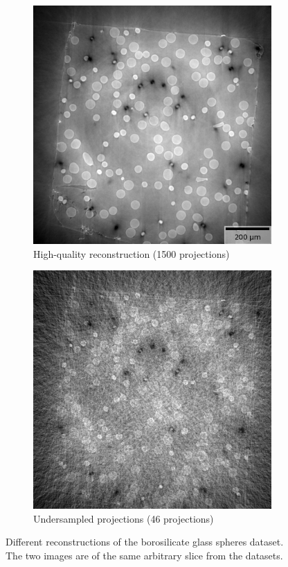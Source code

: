 \begin{figure}
    \begin{subfigure}[t]{.45\textwidth}
      \centering
      \includegraphics[width=\linewidth]{figures/gt32.png}
      \caption{High-quality reconstruction (1500 projections)}
    \end{subfigure}
    \hfill
    \begin{subfigure}[t]{.45\textwidth}
      \centering
      \includegraphics[width=\linewidth]{figures/ns32.png}
      \caption{Undersampled projections (46 projections)}
    \end{subfigure}
    \caption[Borosilicate glass spheres dataset]{Different reconstructions of the borosilicate glass spheres dataset. The two images are of the same arbitrary slice from the datasets. }
    \label{fig:tomo00058datasetexample}
\end{figure}

